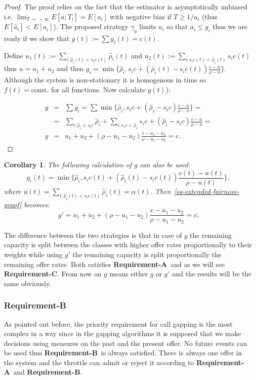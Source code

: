 \documentclass[conference]{IEEEtran}
\newtheorem{corollary}{Corollary}
\newcommand{\limT}{\lim_{T\rightarrow~+\infty}}
\newcommand{\reqA}{\textbf{Requirement-A}}
\newcommand{\reqB}{\textbf{Requirement-B}}
\newcommand{\reqC}{\textbf{Requirement-C}}
\begin{document}
\begin{proof} The proof relies on the fact that the estimator is asymptotically unbiased i.e. $\limT
E[\hat{a};T_i]=E[a_i]$ with negative bias if $T\geq1/a_i$ (thus
$E[\hat{a}_i]<E[a_i]$). The proposed strategy $\gamma_g$ limits
$a_i$ so that $a_i\leq g_i$ thus we are ready if we show that
$g(t):=\sum g_i(t)=c(t)$.

Define $u_1(t):=\sum_{i:\hat{\rho}_i(t)<s_i c(t)}\hat{\rho}_i(t)$
and $u_2(t):=\sum_{i:s_i c(t)<\hat{\rho}_i(t)}s_i c(t)$ thus
$u=u_1+u_2$ and then $g_i=\min\{\hat{\rho}_i,s_i
c+(\hat{\rho}_i(t)-s_i c(t))\frac{c-u}{\rho-u}\}$. Although the
system is non-stationary it is homogenous in time so
$f(t)=\mathrm{const.}$ for all functions. Now calculate $g(t)$):

\begin{eqnarray}\label{eq-extended-fairness-proof}
g&=&\sum
g_i=\sum\min\{\hat{\rho}_i,s_ic+(\hat{\rho}_i-s_ic)\frac{c-u}{\rho-u}\}=\nonumber \\
&=&\sum_{i:\hat{\rho}_i<s_ic}\hat{\rho}_i+\sum_{i:s_i
c<\hat{\rho}_i}s_i
c+(\hat{\rho}_i-s_ic)\frac{c-u}{\rho-u}=\nonumber \\
g&=&u_1+u_2+(\rho-u_1-u_2)\frac{c-u_1-u_2}{\rho-u_1-u_2}=c.
\end{eqnarray}
\end{proof}

\begin{corollary} The following calculation of $g$ can also be used:
\begin{equation}
g_i(t)=\min\{\hat{\rho}_i,s_i c(t)+(\hat{\rho}_i(t)-s_i
c(t))\frac{c(t)-u(t)}{\rho-u(t)}\},
\end{equation}
where $u(t)=\sum_{i:\hat{\rho}_i(t)<s_i c(t)}\hat{\rho}_i(t)=\alpha(t)$.
Then~\eqref{eq-extended-fairness-proof} becomes:
\begin{equation}
g'=u_1+u_2+(\rho-u_1-u_2)\frac{c-u_1-u_2}{\rho-u_1-u_2}=c.
\end{equation}
\end{corollary}

The difference between the two strategies is that in case of $g$ the
remaining capacity is split between the classes with higher offer
rates proportionally to their weights while using $g'$ the remaining
capacity is split proportionally the remaining offer rates. Both
satisfies \reqA\ and as we will see \reqC. From now on $g$ means
either $g$ or $g'$ and the results will be the same obviously.

\subsubsection{Requirement-B}
As pointed out before, the priority requirement for call gapping is
the most complex in a way since in the gapping algorithms it is
supposed that we make decisions using measures on the past and the
present offer. No future events can be used thus \reqB\ is always
satisfied. There is always one offer in the system and the throttle
can admit or reject it according to \reqA\ and \reqB.
\end{document}
